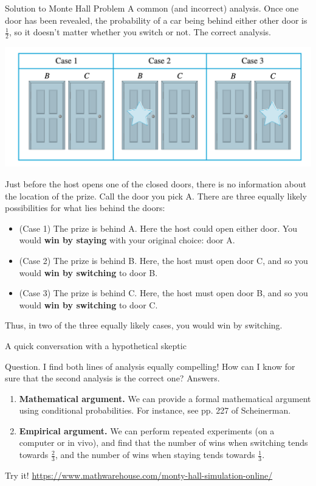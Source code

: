 \documentclass[10pt]{beamer}
\begin{document}
\begin{frame}{Solution to Monte Hall Problem}
\footnotesize 
\colorbox{red!30}{A common (and incorrect) analysis.} Once one door has been revealed, the probability of a car being behind either other door is $\frac{1}{2}$, so it doesn't matter whether you switch or not.
\vfill 
\colorbox{green!30}{The correct analysis.}
\vspace{-0.3cm}
\begin{center}
\includegraphics[width=.4\textwidth]{images/monte_hall_solution}
\end{center}

Just before the host opens one of the closed doors, there is no information about the location of the prize. Call the door you pick A.  There are three equally likely possibilities for what lies behind the doors: 
\vspace{-0.2cm}
\begin{itemize}
\item 	(Case 1) The prize is behind A. Here the host could open either door. You would \textbf{win by staying} with your original choice: door A.
\item (Case 2)  The prize is behind B.  Here, the host must open door C, and so you would \textbf{win by switching} to door B.
\item (Case 3)  The prize is behind C.  Here, the host must open door B, and so you would \textbf{win by switching} to door C.
\end{itemize}
%
 Thus, in two of the three equally likely cases, you would win by switching. %
\end{frame}

\begin{frame}{A quick conversation with a hypothetical skeptic}

\colorbox{red!30}{Question.} \;  I find both lines of analysis equally compelling! How can I know for sure that the second analysis is the correct one?
\pause 
\vfill \vfill 
\colorbox{green!30}{Answers.}

\begin{enumerate}
	\item \textbf{Mathematical argument.} We can provide a formal mathematical argument using conditional probabilities.  For instance, see pp. 227 of Scheinerman.
	\pause  
	\vfill 
	\item \textbf{Empirical argument.} We can perform repeated experiments (on a computer or in vivo), and find that the number of wins when switching tends towards $\frac{2}{3}$, and the number of wins when staying tends towards $\frac{1}{3}$.
\end{enumerate}

\pause 
\vfill 
\colorbox{yellow!50}{Try it!} \quad 
\scriptsize  \url{https://www.mathwarehouse.com/monty-hall-simulation-online/}

\end{frame}
\end{document}
